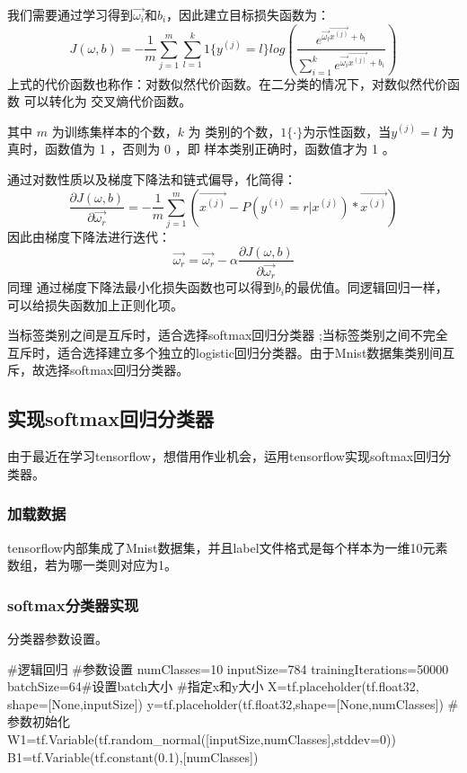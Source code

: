 我们需要通过学习得到$\vec{\omega_i}$和$b_i$，因此建立目标损失函数为：
\begin{equation}
  J(\omega,b)=-\frac{1}{m}\sum_{j=1}^{m}\sum_{l=1}^{k}1\{y^{(j)}=l\}log(\frac{e^{\vec{\omega_l}\vec{x^{(j)}}+b_l}}{\sum_{i=1}^{k}e^{\vec{\omega_i}\vec{x^{(j)}}+b_i}})
\end{equation}
上式的代价函数也称作：对数似然代价函数。在二分类的情况下，对数似然代价函数 可以转化为 交叉熵代价函数。

其中 $m$ 为训练集样本的个数，$k$ 为 类别的个数，$1\{\cdot\}$为示性函数，当$y^{(j)}=l$ 为真时，函数值为 1 ，否则为 0 ，即 样本类别正确时，函数值才为 1 。

通过对数性质以及梯度下降法和链式偏导，化简得：
\begin{equation}
  \frac{\partial{J(\omega,b)}}{\partial\vec{\omega_r}}=-\frac{1}{m}\sum_{j=1}^m\left(\vec{x^{(j)}}-P(y^{(i)}=r|x^{(j)})*\vec{x^{(j)}}\right)
\end{equation}
因此由梯度下降法进行迭代：
\begin{equation}
  \vec{\omega_r}=\vec{\omega_r}-\alpha\frac{\partial{J(\omega,b)}}{\partial\vec{\omega_r}}
\end{equation}
同理 通过梯度下降法最小化损失函数也可以得到$b_i$的最优值。同逻辑回归一样，可以给损失函数加上正则化项。

当标签类别之间是互斥时，适合选择softmax回归分类器 ;当标签类别之间不完全互斥时，适合选择建立多个独立的logistic回归分类器。由于Mnist数据集类别间互斥，故选择softmax回归分类器。

\subsection{实现softmax回归分类器}
由于最近在学习tensorflow，想借用作业机会，运用tensorflow实现softmax回归分类器。
\subsubsection{加载数据}
tensorflow内部集成了Mnist数据集，并且label文件格式是每个样本为一维10元素数组，若为哪一类则对应为1。
\subsubsection{softmax分类器实现}
分类器参数设置。
\begin{python}
  #逻辑回归
  #参数设置
  numClasses=10
  inputSize=784
  trainingIterations=50000
  batchSize=64#设置batch大小
  #指定x和y大小
  X=tf.placeholder(tf.float32, shape=[None,inputSize])
  y=tf.placeholder(tf.float32,shape=[None,numClasses])
  #参数初始化
  W1=tf.Variable(tf.random_normal([inputSize,numClasses],stddev=0))
  B1=tf.Variable(tf.constant(0.1),[numClasses])
\end{python}

